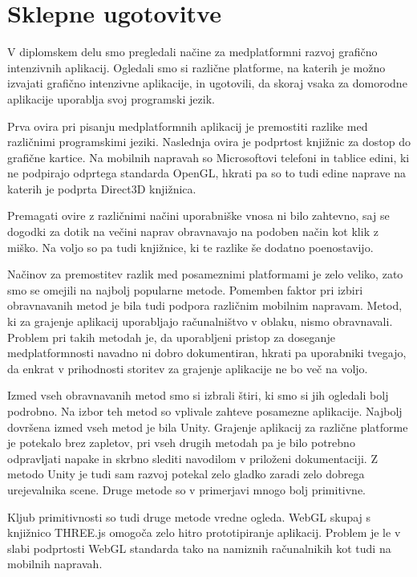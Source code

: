 \chapter{Sklepne ugotovitve}

V diplomskem delu smo pregledali načine za medplatformni razvoj grafično intenzivnih aplikacij. Ogledali smo si različne platforme, na katerih je možno izvajati grafično intenzivne aplikacije, in ugotovili, da skoraj vsaka za domorodne aplikacije uporablja svoj programski jezik. 

Prva ovira pri pisanju medplatformnih aplikacij je premostiti razlike med različnimi programskimi jeziki. Naslednja ovira je podprtost knjižnic za dostop do grafične kartice. Na mobilnih napravah so Microsoftovi telefoni in tablice edini, ki ne podpirajo odprtega standarda OpenGL, hkrati pa so to tudi edine naprave na katerih je podprta Direct3D knjižnica.

Premagati ovire z različnimi načini uporabniške vnosa ni bilo zahtevno, saj se dogodki za dotik na večini naprav obravnavajo na podoben način kot klik z miško. Na voljo so pa tudi knjižnice, ki te razlike še dodatno poenostavijo.

Načinov za premostitev razlik med posameznimi platformami je zelo veliko, zato smo se omejili na najbolj popularne metode. Pomemben faktor pri izbiri obravnavanih metod je bila tudi podpora različnim mobilnim napravam. Metod, ki za grajenje aplikacij uporabljajo računalništvo v oblaku, nismo obravnavali. Problem pri takih metodah je, da uporabljeni pristop za doseganje medplatformnosti navadno ni dobro dokumentiran, hkrati pa uporabniki tvegajo, da enkrat v prihodnosti storitev za grajenje aplikacije ne bo več na voljo.  

Izmed vseh obravnavanih metod smo si izbrali štiri, ki smo si jih ogledali bolj podrobno. Na izbor teh metod so vplivale zahteve posamezne aplikacije. Najbolj dovršena izmed vseh metod je bila Unity. Grajenje aplikacij za različne platforme je potekalo brez zapletov, pri vseh drugih metodah pa je bilo potrebno odpravljati napake in skrbno slediti navodilom v priloženi dokumentaciji. Z metodo Unity je tudi sam razvoj potekal zelo gladko zaradi zelo dobrega urejevalnika scene. Druge metode so v primerjavi mnogo bolj primitivne.

Kljub primitivnosti so tudi druge metode vredne ogleda. WebGL skupaj s knjižnico THREE.js omogoča zelo hitro prototipiranje aplikacij. Problem je le v slabi podprtosti WebGL standarda tako na namiznih računalnikih kot tudi na mobilnih napravah.

